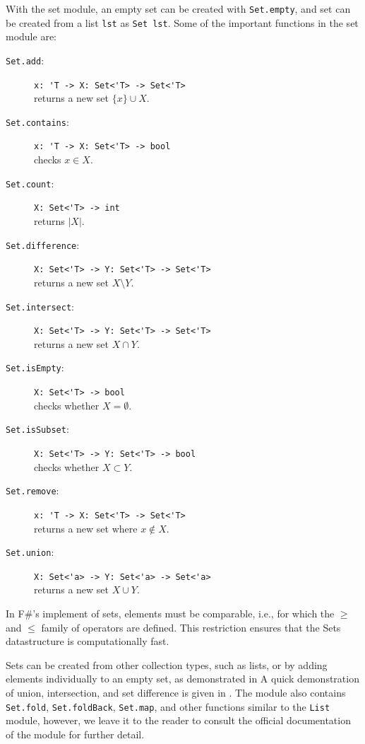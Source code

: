 \documentclass[fsharpNotes.tex]{subfiles}
\begin{document}
With the set module, an empty set can be created with \lstinline{Set.empty}, and set can be created from a list \lstinline{lst} as \lstinline{Set lst}. Some of the important functions in the set module are:
\begin{description}
\item[\texttt{Set.add}:] \lstinline{x: 'T -> X: Set<'T> -> Set<'T>}~\\ returns a new set $\{x\}\cup X$.
\item[\texttt{Set.contains}:] \lstinline{x: 'T -> X: Set<'T> -> bool}~\\ checks $x \in X$.
\item[\texttt{Set.count}:] \lstinline{X: Set<'T> -> int}~\\ returns $|X|$.
\item[\texttt{Set.difference}:] \lstinline{X: Set<'T> -> Y: Set<'T> -> Set<'T>}~\\ returns a new set $X\setminus Y$.
\item[\texttt{Set.intersect}:] \lstinline{X: Set<'T> -> Y: Set<'T> -> Set<'T>}~\\ returns a new set $X\cap Y$.
\item[\texttt{Set.isEmpty}:] \lstinline{X: Set<'T> -> bool}~\\ checks whether $X=\emptyset$.
\item[\texttt{Set.isSubset}:] \lstinline{X: Set<'T> -> Y: Set<'T> -> bool}~\\ checks whether $X\subset Y$.
\item[\texttt{Set.remove}:] \lstinline{x: 'T -> X: Set<'T> -> Set<'T>}~\\ returns a new set where $x\not\in X$.
\item[\texttt{Set.union}:] \lstinline{X: Set<'a> -> Y: Set<'a> -> Set<'a>}~\\ returns a new set $X\cup Y$.
\end{description}
In F\#'s implement of sets, elements must be comparable, i.e., for which the $\ge$ and $\le$ family of operators are defined. This restriction ensures that the Sets datastructure is computationally fast. 

Sets can be created from other collection types, such as lists, or by adding elements individually to an empty set, as demonstrated in 
%
%
A quick demonstration of union, intersection, and set difference is given in .
%
%
The module also contains \lstinline{Set.fold}, \lstinline{Set.foldBack}, \lstinline{Set.map}, and other functions similar to the \lstinline{List} module, however, we leave it to the reader to consult the official documentation of the module for further detail.
\end{document}
